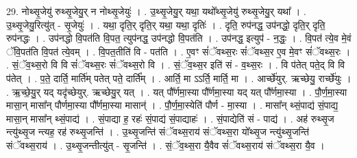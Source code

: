 \documentclass[17pt]{extarticle}
\begin{document}
29. नोथ्सृ॒जेयु॑ रुथ्सृ॒जेयु॒र् न नोथ्सृ॒जेयुः॑ । . उ॒थ्सृ॒जेयु॒र् यथा॒ यथो᳚थ्सृ॒जेयु॑ रुथ्सृ॒जेयु॒र् यथा᳚ । . उ॒थ्सृ॒जेयु॒रित्यु॑त् - सृ॒जेयुः॑ । . यथा॒ दृति॒र् दृति॒र् यथा॒ यथा॒ दृतिः॑ । . दृति॒ रुप॑नद्ध॒ उप॑नद्धो॒ दृति॒र् दृति॒ रुप॑नद्धः । . उप॑नद्धो वि॒पत॑ति वि॒पत॒ त्युप॑नद्ध॒ उप॑नद्धो वि॒पत॑ति । . उप॑नद्ध॒ इत्युप॑ - न॒द्धः॒ । . वि॒पत॑ त्ये॒व मे॒वं ॅवि॒पत॑ति वि॒पत॑ त्ये॒वम् । . वि॒पत॒तीति॑ वि - पत॑ति । . ए॒वꣳ सं॑ॅवथ्स॒रः सं॑ॅवथ्स॒र ए॒व मे॒वꣳ सं॑ॅवथ्स॒रः । . सं॒ॅव॒थ्स॒रो वि वि सं॑ॅवथ्स॒रः सं॑ॅवथ्स॒रो वि । . सं॒ॅव॒थ्स॒र इति॑ सं - व॒थ्स॒रः । . वि प॑तेत् पते॒द् वि वि प॑तेत् । . प॒ते॒ दार्ति॒ मार्ति॑म् पतेत् पते॒ दार्ति᳚म् । . आर्ति॒ मा ऽऽर्ति॒ मार्ति॒ मा । . आर्च्छे॑युर्. ऋच्छेयु॒ रार्च्छे॑युः । . ऋ॒च्छे॒यु॒र् यद् यदृ॑च्छेयुर्. ऋच्छेयु॒र् यत् । . यत् पौ᳚र्णमा॒स्या पौ᳚र्णमा॒स्या यद् यत् पौ᳚र्णमा॒स्या । . पौ॒र्ण॒मा॒स्या मासा॒न् मासा᳚न् पौर्णमा॒स्या पौ᳚र्णमा॒स्या मासान्॑ । . पौ॒र्ण॒मा॒स्येति॑ पौर्ण - मा॒स्या । . मासा᳚न् थ्सं॒पाद्य॑ सं॒पाद्य॒ मासा॒न् मासा᳚न् थ्सं॒पाद्य॑ । . सं॒पाद्या ह॒ रहः॑ सं॒पाद्य॑ सं॒पाद्याहः॑ । . सं॒पाद्येति॑ सं - पाद्य॑ । . अह॑ रुथ्सृ॒ज न्त्यु॑थ्सृ॒ज न्त्यह॒ रह॑ रुथ्सृ॒जन्ति॑ । . उ॒थ्सृ॒जन्ति॑ संॅवथ्स॒राय॑ संॅवथ्स॒रा यो᳚थ्सृ॒ज न्त्यु॑थ्सृ॒जन्ति॑ संॅवथ्स॒राय॑ । . उ॒थ्सृ॒जन्तीत्यु॑त् - सृ॒जन्ति॑ । . सं॒ॅव॒थ्स॒रा यै॒वैव सं॑ॅवथ्स॒राय॑ संॅवथ्स॒रा यै॒व । \newline
\end{document}
